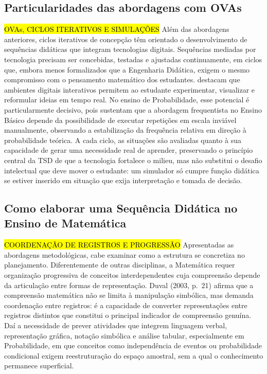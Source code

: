 {\subsection{Particularidades das abordagens com OVAs}

\hl {OVAs, CICLOS ITERATIVOS E SIMULAÇÕES} Além das abordagens anteriores, ciclos iterativos de concepção têm orientado o desenvolvimento de sequências didáticas que integram tecnologias digitais. Sequências mediadas por tecnologia precisam ser concebidas, testadas e ajustadas continuamente, em ciclos que, embora menos formalizados que a Engenharia Didática, exigem o mesmo compromisso com o pensamento matemático dos estudantes.  destacam que ambientes digitais interativos permitem ao estudante experimentar, visualizar e reformular ideias em tempo real. No ensino de Probabilidade, esse potencial é particularmente decisivo, pois  sustentam que a abordagem frequentista no Ensino Básico depende da possibilidade de executar repetições em escala inviável manualmente, observando a estabilização da frequência relativa em direção à probabilidade teórica. A cada ciclo, as situações são avaliadas quanto à sua capacidade de gerar uma necessidade real de aprender, preservando o princípio central da TSD de que a tecnologia fortalece o milieu, mas não substitui o desafio intelectual que deve mover o estudante: um simulador só cumpre função didática se estiver inserido em situação que exija interpretação e tomada de decisão.

\subsection{Como elaborar uma Sequência Didática no Ensino de Matemática}

\hl {COORDENAÇÃO DE REGISTROS E PROGRESSÃO} Apresentadas as abordagens metodológicas, cabe examinar como a estrutura se concretiza no planejamento. Diferentemente de outras disciplinas, a Matemática requer organização progressiva de conceitos interdependentes cuja compreensão depende da articulação entre formas de representação. Duval (2003, p.~21) afirma que a compreensão matemática não se limita à manipulação simbólica, mas demanda coordenação entre registros: é a capacidade de converter representações entre registros distintos que constitui o principal indicador de compreensão genuína. Daí a necessidade de prever atividades que integrem linguagem verbal, representação gráfica, notação simbólica e análise tabular, especialmente em Probabilidade, em que conceitos como independência de eventos ou probabilidade condicional exigem reestruturação do espaço amostral, sem a qual o conhecimento permanece superficial.

}
